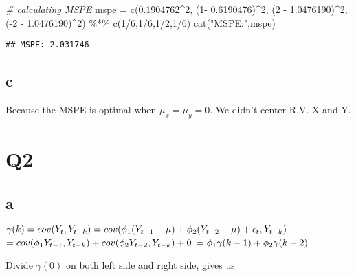 \documentclass[
]{article}
\newenvironment{Shaded}{\begin{snugshade}}{\end{snugshade}}
\newcommand{\CommentTok}[1]{\textcolor[rgb]{0.56,0.35,0.01}{\textit{#1}}}
\newcommand{\DecValTok}[1]{\textcolor[rgb]{0.00,0.00,0.81}{#1}}
\newcommand{\FloatTok}[1]{\textcolor[rgb]{0.00,0.00,0.81}{#1}}
\newcommand{\FunctionTok}[1]{\textcolor[rgb]{0.00,0.00,0.00}{#1}}
\newcommand{\NormalTok}[1]{#1}
\newcommand{\OtherTok}[1]{\textcolor[rgb]{0.56,0.35,0.01}{#1}}
\newcommand{\SpecialCharTok}[1]{\textcolor[rgb]{0.00,0.00,0.00}{#1}}
\newcommand{\StringTok}[1]{\textcolor[rgb]{0.31,0.60,0.02}{#1}}
\begin{document}
\begin{Shaded}
\begin{Highlighting}[]
\CommentTok{\# calculating MSPE}
\NormalTok{mspe }\OtherTok{=} \FunctionTok{c}\NormalTok{(}\FloatTok{0.1904762}\SpecialCharTok{\^{}}\DecValTok{2}\NormalTok{, (}\DecValTok{1}\SpecialCharTok{{-}} \FloatTok{0.6190476}\NormalTok{)}\SpecialCharTok{\^{}}\DecValTok{2}\NormalTok{, (}\DecValTok{2} \SpecialCharTok{{-}} \FloatTok{1.0476190}\NormalTok{)}\SpecialCharTok{\^{}}\DecValTok{2}\NormalTok{,}
\NormalTok{         (}\SpecialCharTok{{-}}\DecValTok{2} \SpecialCharTok{{-}} \FloatTok{1.0476190}\NormalTok{)}\SpecialCharTok{\^{}}\DecValTok{2}\NormalTok{) }\SpecialCharTok{\%*\%} \FunctionTok{c}\NormalTok{(}\DecValTok{1}\SpecialCharTok{/}\DecValTok{6}\NormalTok{,}\DecValTok{1}\SpecialCharTok{/}\DecValTok{6}\NormalTok{,}\DecValTok{1}\SpecialCharTok{/}\DecValTok{2}\NormalTok{,}\DecValTok{1}\SpecialCharTok{/}\DecValTok{6}\NormalTok{)}
\FunctionTok{cat}\NormalTok{(}\StringTok{"MSPE:"}\NormalTok{,mspe)}
\end{Highlighting}
\end{Shaded}

\begin{verbatim}
## MSPE: 2.031746
\end{verbatim}

\hypertarget{c}{%
\subsection{c}\label{c}}

Because the MSPE is optimal when \(\mu_x = \mu_y = 0\). We didn't center
R.V. X and Y.

\hypertarget{q2}{%
\section{Q2}\label{q2}}

\hypertarget{a-1}{%
\subsection{a}\label{a-1}}

\(\gamma(k) = cov(Y_t,Y_{t-k}) = cov(\phi_1(Y_{t-1}-\mu)+\phi_2(Y_{t-2}-\mu)+\epsilon_t,Y_{t-k})\\\)
\(= cov(\phi_1Y_{t-1},Y_{t-k})+cov(\phi_2Y_{t-2},Y_{t-k}) + 0\\\)
\(= \phi_1\gamma(k-1) + \phi_2\gamma(k-2)\\\)

Divide \(\gamma(0)\) on both left side and right side, gives us
\end{document}
